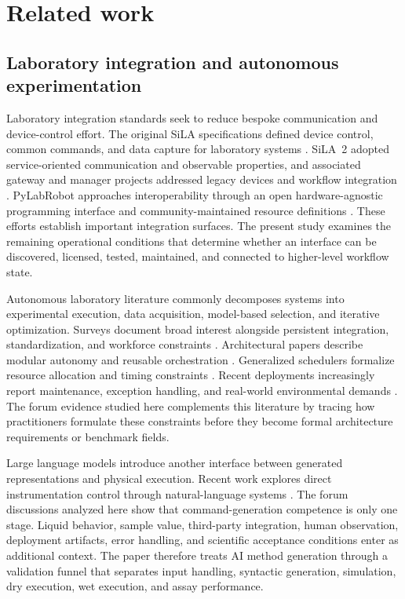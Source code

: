 \section{Related work}
\label{sec:related}

\subsection{Laboratory integration and autonomous experimentation}

Laboratory integration standards seek to reduce bespoke communication and device-control effort. The original SiLA specifications defined device control, common commands, and data capture for laboratory systems \cite{bar2012sila}. SiLA~2 adopted service-oriented communication and observable properties, and associated gateway and manager projects addressed legacy devices and workflow integration \cite{juchli2022sila2,porr2020gateway,bromig2022manager}. PyLabRobot approaches interoperability through an open hardware-agnostic programming interface and community-maintained resource definitions \cite{wierenga2023pylabrobot}. These efforts establish important integration surfaces. The present study examines the remaining operational conditions that determine whether an interface can be discovered, licensed, tested, maintained, and connected to higher-level workflow state.

Autonomous laboratory literature commonly decomposes systems into experimental execution, data acquisition, model-based selection, and iterative optimization. Surveys document broad interest alongside persistent integration, standardization, and workforce constraints \cite{hung2024community}. Architectural papers describe modular autonomy and reusable orchestration \cite{canty2023autonomy,fei2024alabos}. Generalized schedulers formalize resource allocation and timing constraints \cite{cousty2024glas}. Recent deployments increasingly report maintenance, exception handling, and real-world environmental demands \cite{ochiai2025selfmaintainability,robertson2026airfree}. The forum evidence studied here complements this literature by tracing how practitioners formulate these constraints before they become formal architecture requirements or benchmark fields.

Large language models introduce another interface between generated representations and physical execution. Recent work explores direct instrumentation control through natural-language systems \cite{xie2025llmcontrol}. The forum discussions analyzed here show that command-generation competence is only one stage. Liquid behavior, sample value, third-party integration, human observation, deployment artifacts, error handling, and scientific acceptance conditions enter as additional context. The paper therefore treats AI method generation through a validation funnel that separates input handling, syntactic generation, simulation, dry execution, wet execution, and assay performance.

